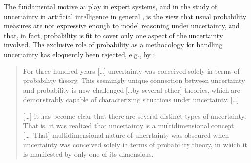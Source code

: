 The fundamental motive at play in expert systems,
and in the study of uncertainty in artificial intelligence in general \parencite[see, e.g.,][]{2006:lawry},
is the view that usual probability measures
are not expressive enough to model reasoning under uncertainty,
and that, in fact, probability is fit to cover only one aspect of the uncertainty involved.
The exclusive role of probability as a methodology for handling uncertainty has eloquently been rejected,
e.g., by \textcite[p.~1]{1999:klir}: 
\begin{quotation}
\begin{small}
For three hundred years [\ldots] uncertainty was conceived solely in
terms of probability theory. This seemingly unique connection
between uncertainty and probability is now challenged [\ldots by several
other] theories, which are demonstrably capable of characterizing
situations under uncertainty. [\ldots]

[\ldots] it has become clear that there are several distinct types of
uncertainty. That is, it was realized that uncertainty is a
multidimensional concept. [\ldots\ That] multidimensional nature of
uncertainty was obscured when uncertainty was conceived solely in
terms of probability theory, in which it is manifested by only one
of its dimensions.
\end{small}
\end{quotation}

